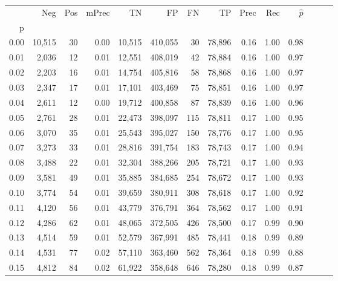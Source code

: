 \begin{tabular}{rrrrrrrrrrrrrr}
\toprule
{} &     Neg &    Pos & mPrec &       TN &       FP &      FN &      TP &  Prec &   Rec & $\hat{p}$ \\
p    &         &        &       &          &          &         &         &       &       &           \\
\midrule
0.00 &  10,515 &     30 &  0.00 &   10,515 &  410,055 &      30 &  78,896 &  0.16 &  1.00 &      0.98 \\
0.01 &   2,036 &     12 &  0.01 &   12,551 &  408,019 &      42 &  78,884 &  0.16 &  1.00 &      0.97 \\
0.02 &   2,203 &     16 &  0.01 &   14,754 &  405,816 &      58 &  78,868 &  0.16 &  1.00 &      0.97 \\
0.03 &   2,347 &     17 &  0.01 &   17,101 &  403,469 &      75 &  78,851 &  0.16 &  1.00 &      0.97 \\
0.04 &   2,611 &     12 &  0.00 &   19,712 &  400,858 &      87 &  78,839 &  0.16 &  1.00 &      0.96 \\
0.05 &   2,761 &     28 &  0.01 &   22,473 &  398,097 &     115 &  78,811 &  0.17 &  1.00 &      0.95 \\
0.06 &   3,070 &     35 &  0.01 &   25,543 &  395,027 &     150 &  78,776 &  0.17 &  1.00 &      0.95 \\
0.07 &   3,273 &     33 &  0.01 &   28,816 &  391,754 &     183 &  78,743 &  0.17 &  1.00 &      0.94 \\
0.08 &   3,488 &     22 &  0.01 &   32,304 &  388,266 &     205 &  78,721 &  0.17 &  1.00 &      0.93 \\
0.09 &   3,581 &     49 &  0.01 &   35,885 &  384,685 &     254 &  78,672 &  0.17 &  1.00 &      0.93 \\
0.10 &   3,774 &     54 &  0.01 &   39,659 &  380,911 &     308 &  78,618 &  0.17 &  1.00 &      0.92 \\
0.11 &   4,120 &     56 &  0.01 &   43,779 &  376,791 &     364 &  78,562 &  0.17 &  1.00 &      0.91 \\
0.12 &   4,286 &     62 &  0.01 &   48,065 &  372,505 &     426 &  78,500 &  0.17 &  0.99 &      0.90 \\
0.13 &   4,514 &     59 &  0.01 &   52,579 &  367,991 &     485 &  78,441 &  0.18 &  0.99 &      0.89 \\
0.14 &   4,531 &     77 &  0.02 &   57,110 &  363,460 &     562 &  78,364 &  0.18 &  0.99 &      0.88 \\
0.15 &   4,812 &     84 &  0.02 &   61,922 &  358,648 &     646 &  78,280 &  0.18 &  0.99 &      0.87 \\

\end{tabular}
